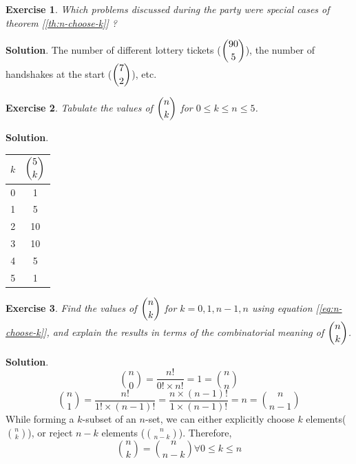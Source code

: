 \documentclass[11pt]{book}
\theoremstyle{definition}
\theoremstyle{plain}
\newtheorem{exercise}{Exercise}
\theoremstyle{definition}
\theoremstyle{problemstyle}
\theoremstyle{remark}
\theoremstyle{definition}
\begin{document}
\begin{exercise}
    Which problems discussed during the party were special cases of theorem [\ref{th:n-choose-k}] ?
    \label{ex:1.8.1}
\end{exercise}
\textbf{Solution}.
The number of different lottery tickets ($\dbinom{90}{5}$), the number of handshakes at the start ($\dbinom{7}{2}$), etc.
\begin{exercise}
    Tabulate the values of $\dbinom{n}{k}$ for $0\leq k\leq n\leq5$.
    \label{ex:1.8.2}
\end{exercise}
\textbf{Solution}.
\begin{table}[H] 
\centering
\begin{tabular}{|c|c|}
 \hline
    $k$&$\dbinom{5}{k}$\\ \hline
 \hline
    0&1\\ \hline
    1&5\\ \hline
    2&10\\ \hline
    3&10\\ \hline
    4&5\\ \hline
    5&1\\ \hline
\end{tabular}
\end{table}
\begin{exercise}
    Find the values of $\dbinom{n}{k}$ for $k=0,1,n - 1,n$ using equation [\ref{eq:n-choose-k}], and explain the results in terms of the combinatorial meaning of $\dbinom{n}{k}$.
    \label{ex:1.8.3}
\end{exercise}
\textbf{Solution}.
\[
    \binom{n}{0}=\frac{n!}{0!\times n!}=1=\binom{n}{n}
\]
\[
    \binom{n}{1}=\frac{n!}{1!\times(n-1)!}=\frac{n\times(n-1)!}{1\times(n-1)!}=n=\binom{n}{n-1}
\]
While forming a $k$-subset of an $n$-set, we can either explicitly choose $k$ elements($\binom{n}{k}$), or reject $n-k$ elements ($\binom{n}{n-k}$). Therefore,
\[
    \binom{n}{k}=\binom{n}{n-k}\forall 0\leq k\leq n
\]
\end{document}
